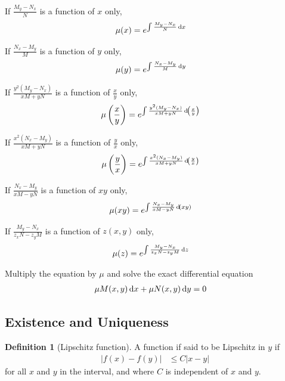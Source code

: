 \documentclass[fleqn, a4paper, 12pt, twoside]{article}
\theoremstyle{definition}
\newtheorem{definition}{Definition}
\theoremstyle{theorem}
\begin{document}
\begin{algorithmic}[1]
	\item
		If $\frac{M_y - N_x}{N}$ is a function of $x$ only,
		\begin{align*}
			\mu(x) &= e^{\int \frac{M_y - N_x}{N} \dif x}
		\end{align*}
	\item
		If $\frac{N_x - M_y}{M}$ is a function of $y$ only,
		\begin{align*}
			\mu(y) &= e^{\int \frac{N_x - M_y}{M} \dif y}
		\end{align*}
	\item
		If $\frac{y^2 (M_y - N_x)}{x M + y N}$ is a function of $\frac{x}{y}$ only,
		\begin{align*}
			\mu\left( \frac{x}{y} \right) &= e^{\int \frac{y^2 (M_y - N_x)}{x M + y N} \dif\left( \frac{x}{y} \right)}
		\end{align*}
	\item
		If $\frac{x^2 (N_x - M_y)}{x M + y N}$ is a function of $\frac{y}{x}$ only,
		\begin{align*}
			\mu\left( \frac{y}{x} \right) &= e^{\int \frac{x^2 (N_x - M_y)}{x M + y N} \dif\left( \frac{y}{x} \right)}
		\end{align*}
	\item
		If $\frac{N_x - M_y}{x M - y N}$ is a function of $x y$ only,
		\begin{align*}
			\mu(x y) &= e^{\int \frac{N_x - M_y}{x M - y N} \dif (x y)}
		\end{align*}
	\item
		If $\frac{M_y - N_x}{z_x N - z_y M}$ is a function of $z(x,y)$ only,
		\begin{align*}
			\mu(z) &= e^{\int \frac{M_y - N_x}{z_x N - z_y M} \dif z}
		\end{align*}
	\item
		Multiply the equation by $\mu$ and solve the exact differential equation
		\begin{align*}
			\mu M(x,y) \dif x + \mu N(x,y) \dif y &= 0
		\end{align*}
\end{algorithmic}

\subsection{Existence and Uniqueness}

\begin{definition}[Lipschitz function]
	A function if said to be Lipschitz in $y$ if
	\begin{align*}
		\left| f(x) - f(y) \right| &\le C |x - y|
	\end{align*}
	for all $x$ and $y$ in the interval, and where $C$ is independent of $x$ and $y$.
\end{definition}
\end{document}

